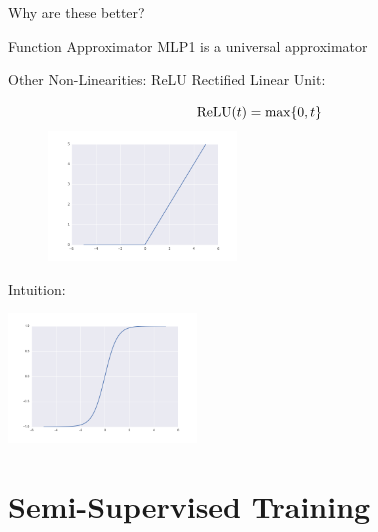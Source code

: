 \documentclass{beamer}
\begin{document}
\begin{frame}
  Why are these better?
\end{frame}

\begin{frame}{Function Approximator}
  MLP1 is a universal approximator
\end{frame}

\begin{frame}{Other Non-Linearities: ReLU}
  Rectified Linear Unit:
  \begin{figure}
    \centering
    \[\relu(t) = \max\{0, t\} \]
    \includegraphics[width=5cm]{../notebooks/Relu}
  \end{figure}
  Intuition:
\end{frame}

\begin{frame}
    \includegraphics[width=5cm]{../notebooks/tanh}
\end{frame}

\section{Semi-Supervised Training}

\begin{frame}

\end{frame}
\end{document}
